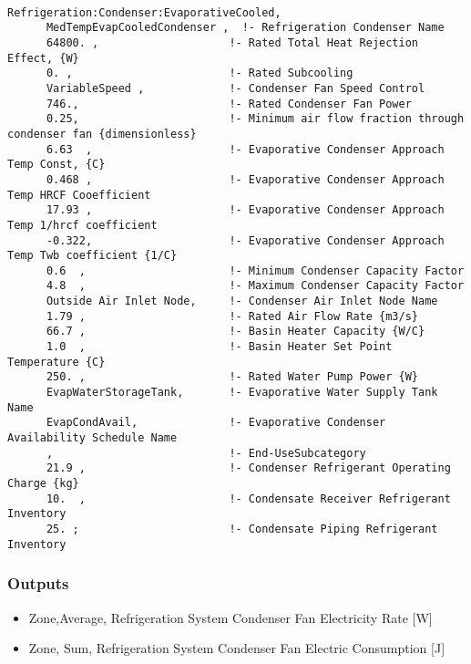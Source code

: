\begin{lstlisting}

Refrigeration:Condenser:EvaporativeCooled,
      MedTempEvapCooledCondenser ,  !- Refrigeration Condenser Name
      64800. ,                    !- Rated Total Heat Rejection Effect, {W}
      0. ,                        !- Rated Subcooling
      VariableSpeed ,             !- Condenser Fan Speed Control
      746.,                       !- Rated Condenser Fan Power
      0.25,                       !- Minimum air flow fraction through condenser fan {dimensionless}
      6.63  ,                     !- Evaporative Condenser Approach Temp Const, {C}
      0.468 ,                     !- Evaporative Condenser Approach Temp HRCF Cooefficient
      17.93 ,                     !- Evaporative Condenser Approach Temp 1/hrcf coefficient
      -0.322,                     !- Evaporative Condenser Approach Temp Twb coefficient {1/C}
      0.6  ,                      !- Minimum Condenser Capacity Factor
      4.8  ,                      !- Maximum Condenser Capacity Factor
      Outside Air Inlet Node,     !- Condenser Air Inlet Node Name
      1.79 ,                      !- Rated Air Flow Rate {m3/s}
      66.7 ,                      !- Basin Heater Capacity {W/C}
      1.0  ,                      !- Basin Heater Set Point Temperature {C}
      250. ,                      !- Rated Water Pump Power {W}
      EvapWaterStorageTank,       !- Evaporative Water Supply Tank Name
      EvapCondAvail,              !- Evaporative Condenser Availability Schedule Name
      ,                           !- End-UseSubcategory
      21.9 ,                      !- Condenser Refrigerant Operating Charge {kg}
      10.  ,                      !- Condensate Receiver Refrigerant Inventory
      25. ;                       !- Condensate Piping Refrigerant Inventory
\end{lstlisting}

\subsubsection{Outputs}\label{outputs-7-008}

\begin{itemize}
\item
  Zone,Average, Refrigeration System Condenser Fan Electricity Rate {[}W{]}
\item
  Zone, Sum, Refrigeration System Condenser Fan Electric Consumption {[}J{]}
\end{itemize}

